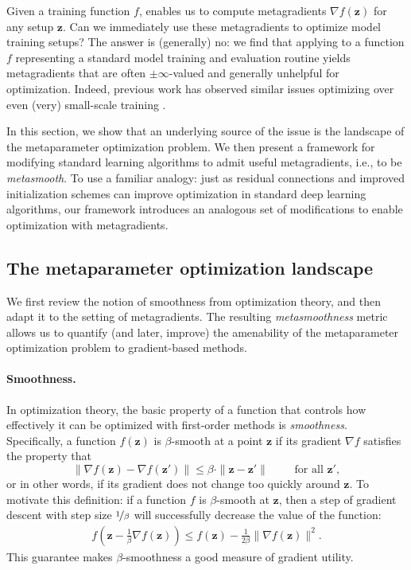 Given a training function $f$, \replay{} enables us to compute metagradients
$\nabla f(\mathbf{z})$ for any setup $\mathbf{z}$. Can we immediately
use these metagradients to
optimize model training setups?
The answer is (generally) no:
we find that applying \replay{} to a function $f$ representing a standard model
training and evaluation routine yields metagradients that are often
$\pm\infty$-valued and generally unhelpful for optimization.
Indeed, previous work has observed similar issues optimizing
over even (very) small-scale training
\citep{bengio1994learning,pearlmutter1996investigation,maclaurin2015gradient}.

In this section, we show that an underlying source of the issue is the
{landscape} of the metaparameter optimization problem.
We then present a framework for modifying standard learning
algorithms
to admit useful metagradients, i.e., to be {\em metasmooth}.
To use a familiar analogy:
just as residual connections and improved initialization schemes can improve
optimization in standard deep learning algorithms, our framework introduces an
analogous set of modifications to enable optimization with metagradients.

\subsection{The metaparameter optimization landscape}
\label{sec:smoothness}
We first review the notion of smoothness from optimization theory,
and then adapt it to the setting of metagradients.
The resulting {\em metasmoothness} metric allows us to quantify
(and later, improve) the amenability
of the metaparameter optimization problem to gradient-based methods.

\paragraph{Smoothness.}
In optimization theory,
the basic property of a function that controls how effectively it can
be optimized
with first-order methods is {\em smoothness}.
Specifically, a function $f(\mathbf{z})$ is $\beta$-smooth at a point
$\mathbf{z}$
if its gradient $\nabla f$ satisfies the property that
\begin{equation}
  \label{eq:smoothness}
  \|\nabla f(\mathbf{z}) - \nabla f(\mathbf{z}')\| \leq \beta \cdot
  \|\mathbf{z} - \mathbf{z}'\| \qquad \text{ for all $\mathbf{z}'$},
\end{equation}
or in other words, if its gradient does not change too quickly around
$\mathbf{z}$.
To motivate this definition:
if a function $f$ is
$\beta$-smooth at $\mathbf{z}$, then a step of gradient descent with step size
$\nicefrac{1}{\beta}$ will successfully decrease the value of the function:
\begin{align*}
  f\left(\mathbf{z} - \frac{1}{\beta} \nabla f(\mathbf{z})\right)
  \leq f(\mathbf{z}) - \frac{1}{2\beta}\|\nabla f(\mathbf{z})\|^2.
\end{align*}
This guarantee makes $\beta$-smoothness
a good measure of gradient utility.

